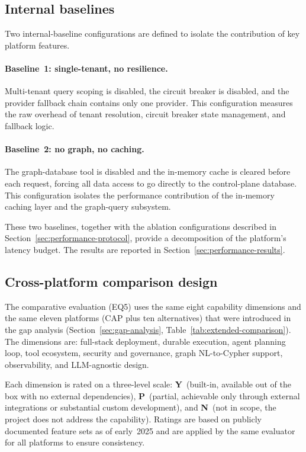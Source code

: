 \documentclass[a4paper]{sapthesis}
\begin{document}
\subsection{Internal baselines}

Two internal-baseline configurations are defined to isolate the
contribution of key platform features.

\paragraph{Baseline~1: single-tenant, no resilience.}
Multi-tenant query scoping is disabled, the circuit breaker is disabled,
and the provider fallback chain contains only one provider.  This
configuration measures the raw overhead of tenant resolution, circuit
breaker state management, and fallback logic.

\paragraph{Baseline~2: no graph, no caching.}
The graph-database tool is disabled and the in-memory cache is cleared
before each request, forcing all data access to go directly to the
control-plane database.  This configuration isolates the performance
contribution of the in-memory caching layer and the graph-query subsystem.

These two baselines, together with the ablation configurations described
in Section~\ref{sec:performance-protocol}, provide a decomposition of
the platform's latency budget.  The results are reported in
Section~\ref{sec:performance-results}.

\subsection{Cross-platform comparison design}

The comparative evaluation (EQ5) uses the same eight capability dimensions
and the same eleven platforms (CAP plus ten alternatives) that were
introduced in the gap analysis (Section~\ref{sec:gap-analysis},
Table~\ref{tab:extended-comparison}).  The dimensions are: full-stack
deployment, durable execution, agent planning loop, tool ecosystem,
security and governance, graph NL-to-Cypher support, observability, and
LLM-agnostic design.

Each dimension is rated on a three-level scale:
\textbf{Y}~(built-in, available out of the box with no external
dependencies), \textbf{P}~(partial, achievable only through external
integrations or substantial custom development), and
\textbf{N}~(not in scope, the project does not address the capability).
Ratings are based on publicly documented feature sets as of early~2025
and are applied by the same evaluator for all platforms to ensure
consistency.
\end{document}
